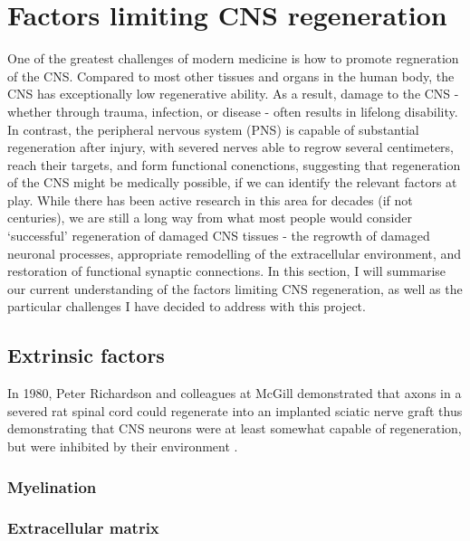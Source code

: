 \documentclass[
]{book}
\begin{document}
\hypertarget{factors-limiting-cns-regeneration}{%
\section{Factors limiting CNS regeneration}\label{factors-limiting-cns-regeneration}}

One of the greatest challenges of modern medicine is how to promote regneration of the CNS. Compared to most other tissues and organs in the human body, the CNS has exceptionally low regenerative ability. As a result, damage to the CNS - whether through trauma, infection, or disease - often results in lifelong disability. In contrast, the peripheral nervous system (PNS) is capable of substantial regeneration after injury, with severed nerves able to regrow several centimeters, reach their targets, and form functional conenctions, suggesting that regeneration of the CNS might be medically possible, if we can identify the relevant factors at play. While there has been active research in this area for decades (if not centuries), we are still a long way from what most people would consider `successful' regeneration of damaged CNS tissues - the regrowth of damaged neuronal processes, appropriate remodelling of the extracellular environment, and restoration of functional synaptic connections. In this section, I will summarise our current understanding of the factors limiting CNS regeneration, as well as the particular challenges I have decided to address with this project.

\hypertarget{extrinsic-factors}{%
\subsection{Extrinsic factors}\label{extrinsic-factors}}

In 1980, Peter Richardson and colleagues at McGill demonstrated that axons in a severed rat spinal cord could regenerate into an implanted sciatic nerve graft thus demonstrating that CNS neurons were at least somewhat capable of regeneration, but were inhibited by their environment \citep{richardsonAxonsCNSNeurones1980}.

\hypertarget{myelination}{%
\subsubsection{Myelination}\label{myelination}}

\hypertarget{extracellular-matrix}{%
\subsubsection{Extracellular matrix}\label{extracellular-matrix}}
\end{document}
